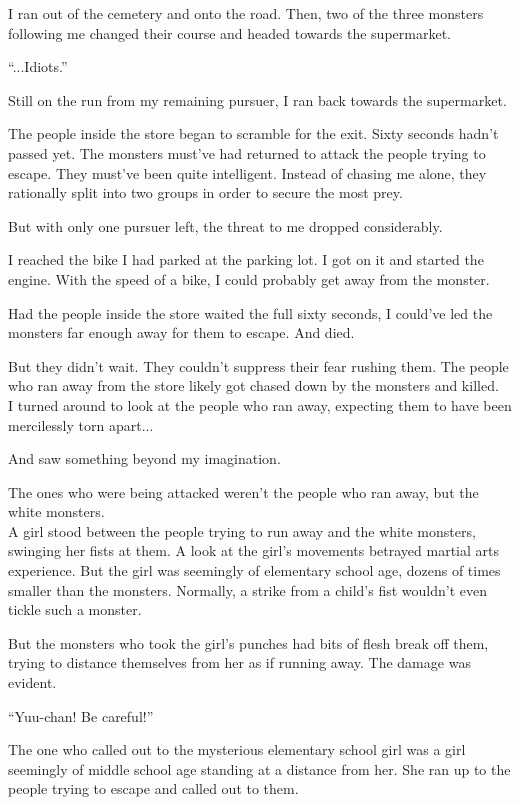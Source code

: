 I ran out of the cemetery and onto the road. Then, two of the three monsters following me changed their course and headed towards the supermarket.

``...Idiots.''

Still on the run from my remaining pursuer, I ran back towards the supermarket.

The people inside the store began to scramble for the exit. Sixty seconds hadn't passed yet. The monsters must've had returned to attack the people trying to escape. They must've been quite intelligent. Instead of chasing me alone,  they rationally split into two groups in order to secure the most prey.

But with only one pursuer left, the threat to me dropped considerably.

I reached the bike I had parked at the parking lot. I got on it and started the engine. With the speed of a bike, I could probably get away from the monster.

Had the people inside the store waited the full sixty seconds, I could've led the monsters far enough away for them to escape. And died.

But they didn't wait. They couldn't suppress their fear rushing them. The people who ran away from the store likely got chased down by the monsters and killed. \\
I turned around to look at the people who ran away, expecting them to have been mercilessly torn apart...

And saw something beyond my imagination.

The ones who were being attacked weren't the people who ran away, but the white monsters. \\
A girl stood between the people trying to run away and the white monsters, swinging her fists at them. A look at the girl's movements betrayed martial arts experience. But the girl was seemingly of elementary school age, dozens of times smaller than the monsters. Normally, a strike from a child's fist wouldn't even tickle such a monster.

But the monsters who took the girl's punches had bits of flesh break off them, trying to distance themselves from her as if running away. The damage was evident.

``Yuu-chan! Be careful!''

The one who called out to the mysterious elementary school girl was a girl seemingly of middle school age standing at a distance from her. She ran up to the people trying to escape and called out to them.

